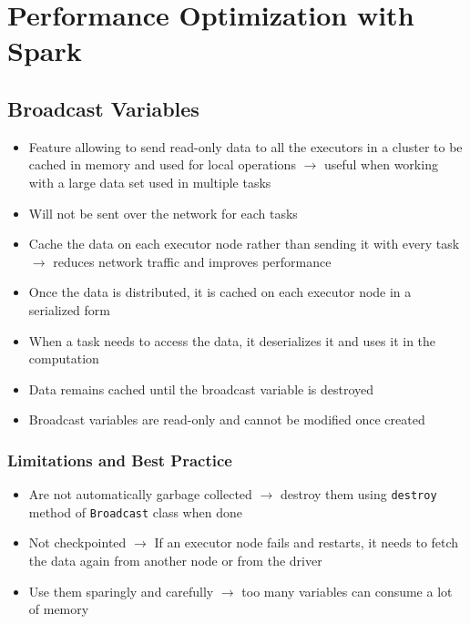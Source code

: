 \documentclass[11pt]{scrartcl}
\begin{document}
\section{Performance Optimization with Spark}
\subsection{Broadcast Variables}
\begin{itemize}
	\item Feature allowing to send read-only data to all the executors in a cluster to be cached in memory and used for local operations $\to$ useful when working with a large data set used in multiple tasks
	\item Will not be sent over the network for each tasks
	\item Cache the data on each executor node rather than sending it with every task $\to$ reduces network traffic and improves performance
	\item Once the data is distributed, it is cached on each executor node in a serialized form
	\item When a task needs to access the data, it deserializes it and uses it in the computation
	\item Data remains cached until the broadcast variable is destroyed
	\item Broadcast variables are read-only and cannot be modified once created
\end{itemize}

\subsubsection{Limitations and Best Practice}
\begin{itemize}
	\item Are not automatically garbage collected $\to$ destroy them using \texttt{destroy} method of \texttt{Broadcast} class when done
	\item Not checkpointed $\to$ If an executor node fails and restarts, it needs to fetch the data again from another node or from the driver
	\item Use them sparingly and carefully $\to$ too many variables can consume a lot of memory
\end{itemize}
\end{document}
